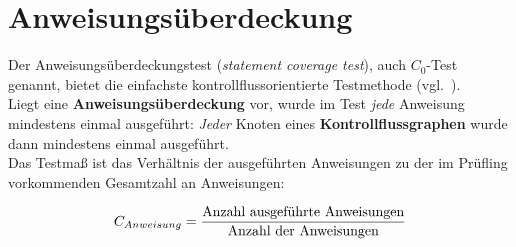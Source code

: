 \section{Anweisungsüberdeckung}

\begin{tcolorbox}[title=Anweisungsüberdeckung ($C_0$-Test)]

    Der Anweisungsüberdeckungstest (\textit{statement coverage test}), auch $C_0$-Test genannt, bietet die einfachste kontrollflussorientierte Testmethode (vgl.~\cite[85]{Lig09a}).\\

    \noindent
    Liegt eine \textbf{Anweisungsüberdeckung} vor, wurde im Test \textit{jede} Anweisung mindestens einmal ausgeführt: \textit{Jeder} Knoten eines \textbf{Kontrollflussgraphen} wurde dann mindestens einmal ausgeführt.\\

    \noindent
    Das Testmaß ist das Verhältnis der ausgeführten Anweisungen zu der im Prüfling vorkommenden Gesamtzahl an Anweisungen:

    \begin{equation}\notag
        C_{Anweisung} = \frac{\text{Anzahl ausgeführte Anweisungen}}{\text{Anzahl der Anweisungen}}
    \end{equation}


\end{tcolorbox}
